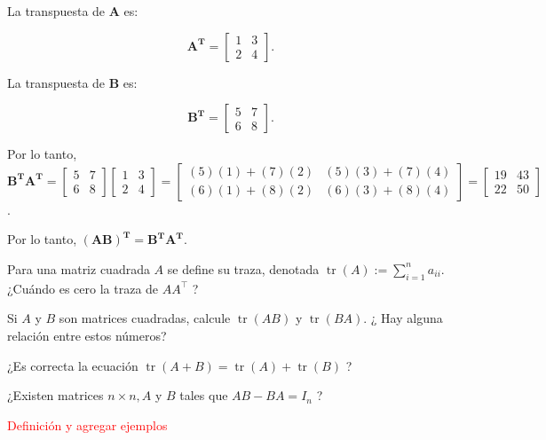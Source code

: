 \begin{solution}
La transpuesta de $\boldsymbol{{A}}$ es:

\[
\boldsymbol{A^T} = \begin{bmatrix} 1 & 3 \\ 2 & 4 \end{bmatrix}.
\]

La transpuesta de $\boldsymbol{B}$ es:

\[
\boldsymbol{B^T}= \begin{bmatrix} 5 & 7 \\ 6 & 8 \end{bmatrix}.
\]

Por lo tanto, $\boldsymbol{B^T A^T} = \begin{bmatrix} 5 & 7 \\ 6 & 8 \end{bmatrix} \begin{bmatrix} 1 & 3 \\ 2 & 4 \end{bmatrix} = \begin{bmatrix} (5)(1) + (7)(2) & (5)(3) + (7)(4) \\ (6)(1) + (8)(2) & (6)(3) + (8)(4) \end{bmatrix} = \begin{bmatrix} 19 & 43 \\ 22 & 50 \end{bmatrix}$.

Por lo tanto, $\boldsymbol{(AB)^T} = \boldsymbol{B^T A^T}$.
   
\end{solution}

\begin{exercise}
 Para una matriz cuadrada $A$ se define su traza, denotada $\operatorname{tr}(A):=\sum_{i=1}^n a_{i i}$. ¿Cuándo es cero la traza de $A A^{\top}$ ?    
\end{exercise}
\begin{exercise}
 Si $A$ y $B$ son matrices cuadradas, calcule $\operatorname{tr}(A B)$ y $\operatorname{tr}(B A)$. ¿ Hay alguna relación entre estos números?
\end{exercise}
\begin{exercise}
 ¿Es correcta la ecuación $\operatorname{tr}(A+B)=\operatorname{tr}(A)+\operatorname{tr}(B)$ ?   
\end{exercise}
\begin{exercise}
  ¿Existen matrices $n \times n, A$ y $B$ tales que $A B-B A=I_n$ ?   
\end{exercise}
\textcolor{red}{ Definición y agregar ejemplos}

